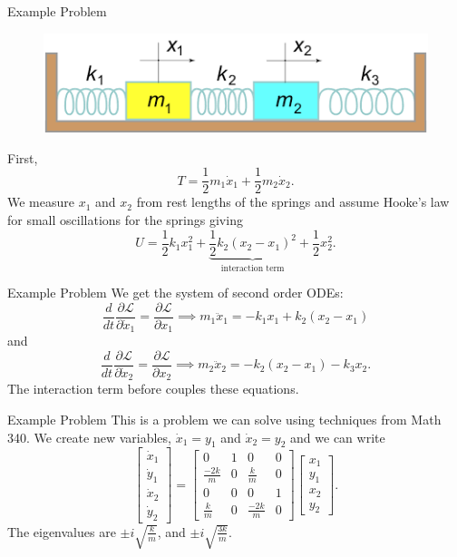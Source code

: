\documentclass[usenames,dvipsnames]{beamer}
\theoremstyle{definition}
\theoremstyle{theorem}
\begin{document}
        \begin{frame}{Example Problem}
            \begin{figure}[h]
                \centering
                \includegraphics[width=.5\textwidth]{Lagrangian_Mechanics/2mass_3spring.png}
            \end{figure}
            First,
            \[
            T=\frac{1}{2}m_1\dot{x}_1+\frac{1}{2}m_2\dot{x}_2.
            \]
            We measure $x_1$ and $x_2$ from rest lengths of the springs and assume Hooke's law for small oscillations for the springs giving
            \[
            U=\frac{1}{2} k_1x_1^2+\underbrace{\frac{1}{2}k_2(x_2-x_1)^2}_{\textrm{interaction term}}+\frac{1}{2}x_2^2.
            \]
        \end{frame}
        
        \begin{frame}{Example Problem}
            We get the system of second order ODEs:
            \[
            \frac{d}{dt}\frac{\partial \mathcal{L}}{\partial \dot{x}_1}= \frac{\partial \mathcal{L}}{\partial x_1} \implies m_1\ddot{x}_1=-k_1x_1+k_2(x_2-x_1)
            \]
            and
            \[
            \frac{d}{dt}\frac{\partial \mathcal{L}}{\partial \dot{x}_2}= \frac{\partial \mathcal{L}}{\partial x_2} \implies m_2\ddot{x}_2=-k_2(x_2-x_1)-k_3x_2.
            \]
            The interaction term before couples these equations.
        \end{frame}
        
        \begin{frame}{Example Problem}
            This is a problem we can solve using techniques from Math 340.  We create new variables, $\dot{x}_1=y_1$ and $\dot{x}_2=y_2$ and we can write
            \[
            \begin{bmatrix}
            \dot{x}_1\\
            \dot{y}_1\\
            \dot{x}_2\\
            \dot{y}_2
            \end{bmatrix}
            =
            \begin{bmatrix}
            0 & 1 & 0 & 0\\
            \frac{-2k}{m} & 0 & \frac{k}{m} & 0\\
            0 & 0 & 0 & 1\\
            \frac{k}{m} & 0 & \frac{-2k}{m} & 0
            \end{bmatrix}
            \begin{bmatrix}
            x_1\\
            y_1\\
            x_2\\
            y_2
            \end{bmatrix}.
            \]
            The eigenvalues are $\pm i\sqrt{\frac{k}{m}}$, and $\pm i\sqrt{\frac{3k}{m}}.$
        \end{frame}
        
\end{document}
